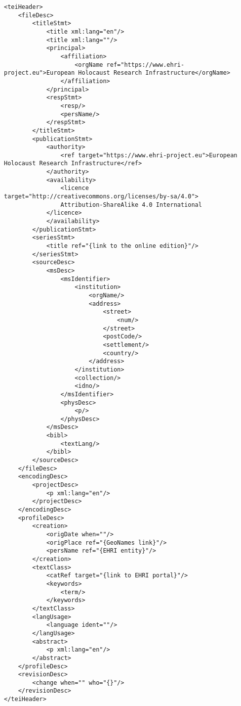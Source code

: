 
\label{Metadonnees}

\begin{verbatim}
<teiHeader>
    <fileDesc>
        <titleStmt>
            <title xml:lang="en"/>
            <title xml:lang=""/>
            <principal>
                <affiliation>
                    <orgName ref="https://www.ehri-project.eu">European Holocaust Research Infrastructure</orgName>
                </affiliation>
            </principal>
            <respStmt>
                <resp/>
                <persName/>
            </respStmt>
        </titleStmt>
        <publicationStmt>
            <authority>
                <ref target="https://www.ehri-project.eu">European Holocaust Research Infrastructure</ref>
            </authority>
            <availability>
                <licence target="http://creativecommons.org/licenses/by-sa/4.0">
                Attribution-ShareAlike 4.0 International
            </licence>
            </availability>
        </publicationStmt>
        <seriesStmt>
            <title ref="{link to the online edition}"/>
        </seriesStmt>
        <sourceDesc>
            <msDesc>
                <msIdentifier>
                    <institution>
                        <orgName/>
                        <address>
                            <street>
                                <num/>
                            </street>
                            <postCode/>
                            <settlement/>
                            <country/>
                        </address>
                    </institution>
                    <collection/>
                    <idno/>
                </msIdentifier>
                <physDesc>
                    <p/>
                </physDesc>
            </msDesc>
            <bibl>
                <textLang/>
            </bibl>
        </sourceDesc>
    </fileDesc>
    <encodingDesc>
        <projectDesc>
            <p xml:lang="en"/>
        </projectDesc>
    </encodingDesc>
    <profileDesc>
        <creation>
            <origDate when=""/>
            <origPlace ref="{GeoNames link}"/>
            <persName ref="{EHRI entity}"/>
        </creation>
        <textClass>
            <catRef target="{link to EHRI portal}"/>
            <keywords>
                <term/>
            </keywords>
        </textClass>
        <langUsage>
            <language ident=""/>
        </langUsage>
        <abstract>
            <p xml:lang="en"/>
        </abstract>
    </profileDesc>
    <revisionDesc>
        <change when="" who="{}"/>
    </revisionDesc>
</teiHeader>
\end{verbatim}